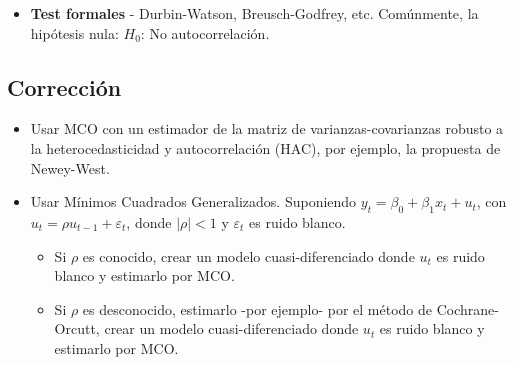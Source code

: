 \documentclass[10pt, a4paper, landscape]{extarticle}
\begin{document}
\begin{multicols}{3}
\begin{itemize}[leftmargin=*]
\begin{multicols}{3}
\begin{center}
				\end{center}
			\end{multicols}
			\item \textbf{Test formales} - Durbin-Watson, Breusch-Godfrey, etc. Comúnmente, la hipótesis nula: $H_0$: No autocorrelación.
		\end{itemize}
	\subsection*{Corrección}
		\begin{itemize}[leftmargin=*]
			\item Usar MCO con un estimador de la matriz de varianzas-covarianzas robusto a la heterocedasticidad y autocorrelación (HAC), por ejemplo, la propuesta de Newey-West.
			\item Usar Mínimos Cuadrados Generalizados. Suponiendo $y_t = \beta_0 + \beta_1 x_t + u_t$, con $u_t = \rho u_{t-1} + \varepsilon_t$, donde $|\rho| < 1$ y $\varepsilon_t$ es ruido blanco.
			\begin{itemize}[leftmargin=*]
				\item Si $\rho$ es conocido, crear un modelo cuasi-diferenciado donde $u_t$ es ruido blanco y estimarlo por MCO.
				\item Si $\rho$ es desconocido, estimarlo -por ejemplo- por el método de Cochrane-Orcutt, crear un modelo cuasi-diferenciado donde $u_t$ es ruido blanco y estimarlo por MCO.
			\end{itemize}
		\end{itemize}
\end{multicols}
\end{document}
